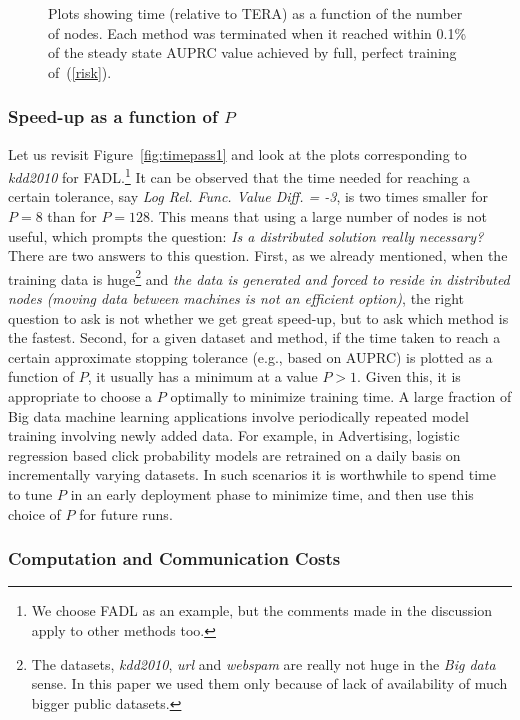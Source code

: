 \documentclass[twoside, 11pt]{article}
\begin{document}
\begin{figure}[H]
\caption{Plots showing time (relative to TERA) as a function of the number of nodes. Each method was terminated when it reached within 0.1\% of the steady state AUPRC value achieved by full, perfect training of~(\ref{risk}).}
\label{fig:auprctime}
\end{figure}

\subsubsection{Speed-up as a function of $P$}
\label{subsubsec:speedup}

Let us revisit Figure~\ref{fig:timepass1} and look at the plots corresponding to {\it kdd2010} for FADL.\footnote{We choose FADL as an example, but the comments made in the discussion apply to other methods too.} It can be observed that the time needed for reaching a certain tolerance, say {\it Log Rel. Func. Value Diff. = -3}, is two times smaller for $P=8$ than for $P=128$. This means that using a large number of nodes is not useful, which prompts the question: {\it Is a distributed solution really necessary?} There are two answers to this question. First, as we already mentioned, when the training data is huge\footnote{The datasets, {\it kdd2010}, {\it url} and {\it webspam} are really not huge in the {\it Big data} sense. In this paper we used them only because of lack of availability of much bigger public datasets.} and {\it the data is generated and forced to reside in distributed nodes (moving data between machines is not an efficient option)}, the right question to ask is not whether we get great speed-up, but to ask which method is the fastest. Second, for a given dataset and method, if the time taken to reach a certain approximate stopping tolerance (e.g., based on AUPRC) is plotted as a function of $P$, it usually has a minimum at a value $P>1$. Given this, it is appropriate to choose a $P$ optimally to minimize training time. A large fraction of Big data machine learning applications involve periodically repeated model training involving newly added data. For example, in Advertising, logistic regression based click probability models are retrained on a daily basis on incrementally varying datasets. In such scenarios it is worthwhile to spend time to tune $P$ in an early deployment phase to minimize time, and then use this choice of $P$ for future runs.

\subsubsection{Computation and Communication Costs}
\label{subsubsec:costs}
\end{document}
